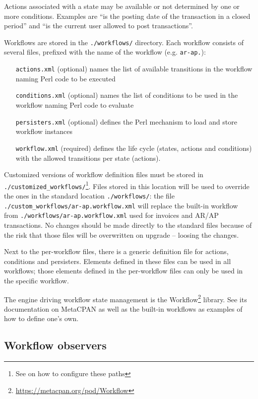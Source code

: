 Actions associated with a state may be available or not determined by one or more conditions.
Examples are ``is the posting date of the transaction in a closed period''
and ``is the current user allowed to post transactions''.

Workflows are stored in the \texttt{./workflows/} directory.  Each workflow consists of
several files, prefixed with the name of the workflow (e.g. \texttt{ar-ap.}):

\begin{enumerate}
	\item [\texttt{actions.xml}] (optional) names the list of available transitions
	in the workflow naming Perl code to be executed
	\item [\texttt{conditions.xml}] (optional) names the list of conditions to be used
	in the workflow naming Perl code to evaluate
	\item [\texttt{persisters.xml}] (optional) defines the Perl mechanism to load and store
	workflow instances
	\item [\texttt{workflow.xml}] (required) defines the life cycle (states, actions
	and conditions) with the allowed transitions per state (actions).
\end{enumerate}

Customized versions of workflow definition files must be stored in
 \texttt{./customized\_workflows/}\footnote{See
 	 on how to configure
 these paths}.  Files stored in this location will be used to override the ones in
the standard location \texttt{./workflows/}: the file
\texttt{./custom\_workflows/ar-ap.workflow.xml} will replace the built-in workflow
from \texttt{./workflows/ar-ap.workflow.xml} used for invoices and AR/AP transactions.
No changes should be made directly to the standard files because of the risk that those
files will be overwritten on upgrade -- loosing the changes.

Next to the per-workflow files, there is a generic definition file for actions,
conditions and persisters.  Elements defined in these files can be used in all
workflows; those elements defined in the per-workflow files can only be used
in the specific workflow.

The engine driving workflow state management is the
Workflow\footnote{\url{https://metacpan.org/pod/Workflow}} library.  See its
documentation on MetaCPAN as well as the built-in workflows as examples of how
to define one's own.

\subsection{Workflow observers}

